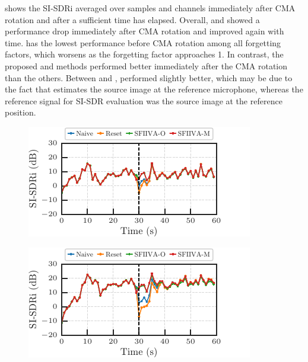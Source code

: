 \documentclass[sip,biber]{now-journal}
\begin{document}
 shows the SI-SDRi averaged over samples and channels immediately after CMA rotation and after a sufficient time has elapsed.
Overall, \NaiveIVA{} and \ResetIVA{} showed a performance drop immediately after CMA rotation and improved again with time.
\ResetIVA{} has the lowest performance before CMA rotation among all forgetting factors, which worsens as the forgetting factor approaches 1.
In contrast, the proposed \SFIIVAm{} and \SFIIVAo{} methods performed better immediately after the CMA rotation than the others.
Between \SFIIVAm{} and \SFIIVAo{}, \SFIIVAm{} performed slightly better,
which may be due to the fact that \SFIIVAo{} estimates the source image at the reference microphone,
whereas the reference signal for SI-SDR evaluation was the source image at the reference position.
\begin{figure}[t]
  \centering
  \begin{minipage}[t]{.45\textwidth}
    \centering\includegraphics{figures/plots/clean/line_900.pdf}\label{fig:plot:line:900}
  \end{minipage}
  \hspace{.05\textwidth}
  \begin{minipage}[t]{.45\textwidth}
    \centering\includegraphics{figures/plots/clean/line_950.pdf}\label{fig:plot:line:950}
  \end{minipage}


\end{figure}
\end{document}
